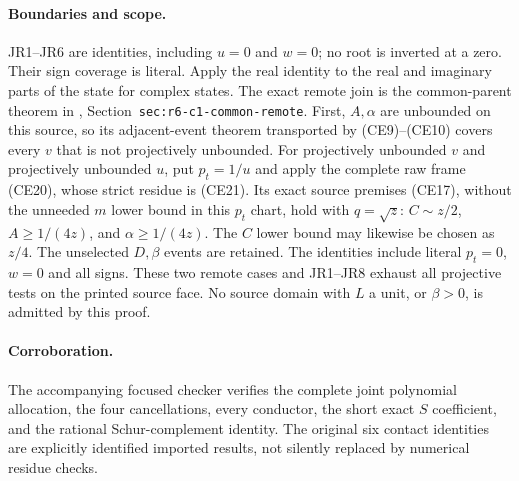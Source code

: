 \paragraph{Boundaries and scope.}
JR1--JR6 are identities, including $u=0$ and $w=0$; no root is inverted
at a zero. Their sign coverage is literal. Apply the real identity to
the real and imaginary parts of the state for complex states.
The exact remote join is the common-parent theorem in
,
Section~\texttt{sec:r6-c1-common-remote}. First, $A,\alpha$ are
unbounded on this source, so its adjacent-event theorem transported by
(CE9)--(CE10) covers every $v$ that is not projectively unbounded.
For projectively unbounded $v$ and projectively unbounded $u$, put
$p_t=1/u$ and apply the complete raw frame (CE20), whose strict
residue is (CE21). Its exact source premises (CE17), without the
unneeded $m$ lower bound in this $p_t$ chart, hold with $q=\sqrt z$:
$C\sim z/2$, $A\ge1/(4z)$, and $\alpha\ge1/(4z)$.
The $C$ lower bound may likewise be chosen as $z/4$. The unselected
$D,\beta$ events are retained. The identities include literal
$p_t=0$, $w=0$ and all signs. These two remote cases and JR1--JR8
exhaust all projective tests on the printed source face. No source
domain with $L$ a unit, or $\beta>0$, is admitted by this proof.

\paragraph{Corroboration.}
The accompanying focused checker verifies the complete joint polynomial
allocation, the four cancellations, every conductor, the short exact
$S$ coefficient, and the rational Schur-complement identity. The
original six contact identities are explicitly identified imported
results, not silently replaced by numerical residue checks.
